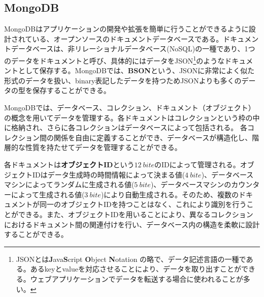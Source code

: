 \subsection{MongoDB\cite{mongo}}
\label{sec:mongo}

MongoDBはアプリケーションの開発や拡張を簡単に行うことができるように設計されている、オープンソースのドキュメントデータベースである。ドキュメントデータベースは、非リレーショナルデータベース(NoSQL)の一種であり、1つのデータをドキュメントと呼び、具体的にはデータをJSON\footnote{JSONとは\textbf{J}ava\textbf{S}cript \textbf{O}bject \textbf{N}otation の略で、データ記述言語の一種である。あるkeyとvalueを対応させることにより、データを取り出すことができる。ウェブアプリケーションでデータを転送する場合に使われることが多い。}のようなドキュメントとして保存する。MongoDBでは、\textbf{BSON}という、JSONに非常によく似た形式のデータを扱い、binary表記したデータを持つためJSONよりも多くのデータの型を保存することができる。

MongoDBでは、データベース、コレクション、ドキュメント（オブジェクト）の概念を用いてデータを管理する。各ドキュメントはコレクションという枠の中に格納され、さらに各コレクションはデータベースによって包括される。
各コレクション間の関係を自由に定義することができ、データベースが構造化し、階層的な性質を持たせてデータを管理することができる。


各ドキュメントは\textbf{オブジェクトID}という$12\ \si{bite}$のIDによって管理される。オブジェクトIDはデータ生成時の時間情報によって決まる値($4\ \si{bite}$)、データベースマシンによってランダムに生成される値($5\ \si{bite}$)、データベースマシンのカウンターによって生成される値($3\ \si{bite}$)により自動生成される。そのため、複数のドキュメントが同一のオブジェクトIDを持つことはなく、これにより識別を行うことができる。また、オブジェクトIDを用いることにより、異なるコレクションにおけるドキュメント間の関連付けを行い、データベース内の構造を柔軟に設計することができる。

